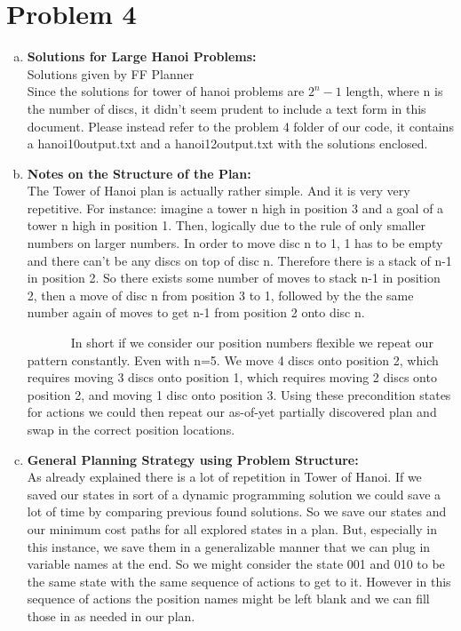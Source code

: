 \documentclass[]{article}
\begin{document}
\section{Problem 4}
	\begin{enumerate}[(a)]
		\item \textbf{Solutions for Large Hanoi Problems:}\\
		Solutions given by FF Planner\\
		Since the solutions for tower of hanoi problems are \(2^{n}-1\) length, where n is the number of discs, it didn't seem prudent to include a text form in this document. Please instead refer to the problem 4 folder of our code, it contains a hanoi10output.txt and a hanoi12output.txt with the solutions enclosed.


		\item \textbf{Notes on the Structure of the Plan:}\\
		The Tower of Hanoi plan is actually rather simple. And it is very very repetitive. For instance: imagine a tower n high in position 3 and a goal of a tower n high in position 1. Then, logically due to the rule of only smaller numbers on larger numbers. In order to move disc n to 1, 1 has to be empty and there can't be any discs on top of disc n. Therefore there is a stack of n-1 in position 2. So there exists some number of moves to stack n-1 in position 2, then a move of disc n from position 3 to 1, followed by the the same number again of moves to get n-1 from position 2 onto disc n.
		
		~~~~~~~In short if we consider our position numbers flexible we repeat our pattern constantly. Even with n=5. We move 4 discs onto position 2, which requires moving 3 discs onto position 1, which requires moving 2 discs onto position 2, and moving 1 disc onto position 3. Using these precondition states for actions we could then repeat our as-of-yet partially discovered plan and swap in the correct position locations. 
				
		\item \textbf{General Planning Strategy using Problem Structure:}\\
		As already explained there is a lot of repetition in Tower of Hanoi. If we saved our states in sort of a dynamic programming solution we could save a lot of time by comparing previous found solutions. So we save our states and our minimum cost paths for all explored states in a plan. But, especially in this instance, we save them in a generalizable manner that we can plug in variable names at the end. So we might consider the state 001 and 010 to be the same state with the same sequence of actions to get to it. However in this sequence of actions the position names might be left blank and we can fill those in as needed in our plan. 
		

\end{enumerate}
\end{document}
